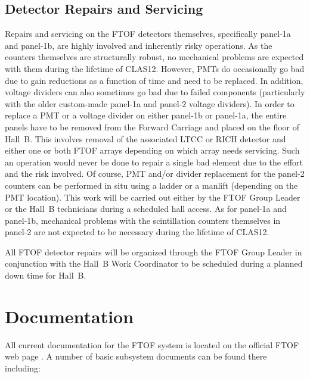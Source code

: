 \documentclass[12pt]{article}
\begin{document}
\subsection{Detector Repairs and Servicing}

Repairs and servicing on the FTOF detectors themselves, specifically panel-1a and 
panel-1b, are highly involved and inherently risky operations. As the counters 
themselves are structurally robust, no mechanical problems are expected with them 
during the lifetime of CLAS12. However, PMTs do occasionally go bad due to gain 
reductions as a function of time and need to be replaced. In addition, voltage 
dividers can also sometimes go bad due to failed components (particularly with the 
older custom-made panel-1a and panel-2 voltage dividers). In order to replace a PMT 
or a voltage divider on either panel-1b or panel-1a, the entire panels have to be 
removed from the Forward Carriage and placed on the floor of Hall~B. This involves 
removal of the associated LTCC or RICH detector and either one or both FTOF arrays 
depending on which array needs servicing. Such an operation would never be done to 
repair a single bad element due to the effort and the risk involved. Of course, PMT 
and/or divider replacement for the panel-2 counters can be performed in situ using a 
ladder or a manlift (depending on the PMT location). This work will be carried out 
either by the FTOF Group Leader or the Hall~B technicians during a scheduled hall 
access. As for panel-1a and panel-1b, mechanical problems with the scintillation 
counters themselves in panel-2 are not expected to be necessary during the lifetime 
of CLAS12.

All FTOF detector repairs will be organized through the FTOF Group Leader in 
conjunction with the Hall~B Work Coordinator to be scheduled during a planned down 
time for Hall~B.

\clearpage

\vfil
\eject

\section{Documentation}

All current documentation for the FTOF system is located on the official FTOF web page
\cite{ftof-web}. A number of basic subsystem documents can be found there including:
\end{document}

